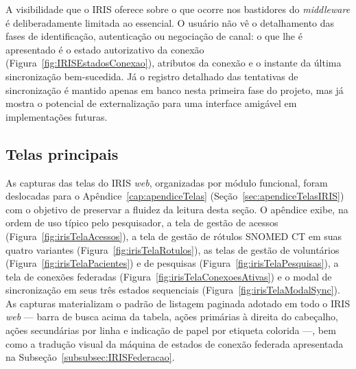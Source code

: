 A visibilidade que o IRIS oferece sobre o que ocorre nos bastidores do \textit{middleware} é deliberadamente limitada ao essencial. O usuário não vê o detalhamento das fases de identificação, autenticação ou negociação de canal: o que lhe é apresentado é o estado autorizativo da conexão (Figura~\ref{fig:IRISEstadosConexao}), atributos da conexão e o instante da última sincronização bem-sucedida. Já o registro detalhado das tentativas de sincronização é mantido apenas em banco nesta primeira fase do projeto, mas já mostra o potencial de externalização para uma interface amigável em implementações futuras.
\subsection{Telas principais}\label{subsec:IRISTelas}

As capturas das telas do IRIS \emph{web}, organizadas por módulo funcional, foram deslocadas para o Apêndice~\ref{cap:apendiceTelas} (Seção~\ref{sec:apendiceTelasIRIS}) com o objetivo de preservar a fluidez da leitura desta seção. O apêndice exibe, na ordem de uso típico pelo pesquisador, a tela de gestão de acessos (Figura~\ref{fig:irisTelaAcessos}), a tela de gestão de rótulos SNOMED CT em suas quatro variantes (Figura~\ref{fig:irisTelaRotulos}), as telas de gestão de voluntários (Figura~\ref{fig:irisTelaPacientes}) e de pesquisas (Figura~\ref{fig:irisTelaPesquisas}), a tela de conexões federadas (Figura~\ref{fig:irisTelaConexoesAtivas}) e o modal de sincronização em seus três estados sequenciais (Figura~\ref{fig:irisTelaModalSync}). As capturas materializam o padrão de listagem paginada adotado em todo o IRIS \emph{web} --- barra de busca acima da tabela, ações primárias à direita do cabeçalho, ações secundárias por linha e indicação de papel por etiqueta colorida ---, bem como a tradução visual da máquina de estados de conexão federada apresentada na Subseção~\ref{subsubsec:IRISFederacao}.





